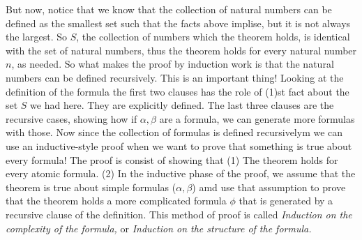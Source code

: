 \documentclass[9pt,a4paper, twocolumn]{article}
\newcounter{theo}
\begin{document}
        But now, notice that we know that the collection of natural numbers can be defined as the smallest set such that the facts above implise, but it is not always the largest. So $S$, the collection of numbers which the theorem holds, is identical with the set of natural numbers, thus the theorem holds for every natural number $n$, as needed. So what makes the proof by induction work is that the natural numbers can be defined recursively. This is an important thing! Looking at the definition of the formula the first two clauses has the role of (1)st fact about the set $S$ we had here. They are explicitly defined. The last three clauses are the recursive cases, showing how if $\alpha, \beta$ are a formula, we can generate more formulas with those. Now since the collection of formulas is defined recursivelym we can use an inductive-style proof when we want to prove that something is true about every formula! The proof is consist of showing that (1) The theorem holds for every atomic formula. (2) In the inductive phase of the proof, we assume that the theorem is true about simple formulas ($\alpha,\beta$) amd use that assumption to prove that the theorem holds a more complicated formula $\phi$ that is generated by a recursive clause of the definition. This method of proof is called \textit{Induction on the complexity of the formula,} or \textit{Induction on the structure of the formula.}
        
\end{document}
